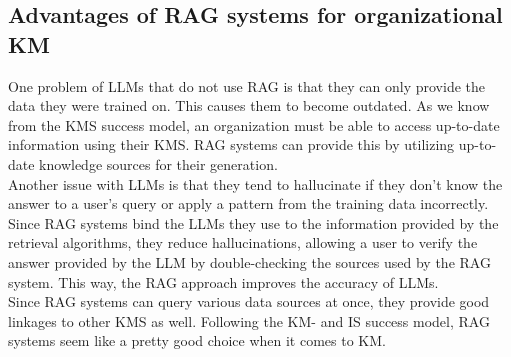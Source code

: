 \documentclass[
	english,
	ruledheaders=section,%
	class=report,%
	thesis={type=bachelor},%
	accentcolor=1b,%
	custommargins=true,%
	marginpar=false,%
	parskip=half-,%
	fontsize=11pt,%
	DIV=14,
]{tudapub}
\begin{document}
\subsection{Advantages of RAG systems for organizational KM}
One problem of LLMs that do not use RAG is that they can only provide the data they were trained on. This causes them to become outdated. As we know from the KMS success model, an organization must be able to access up-to-date information using their KMS. RAG systems can provide this by utilizing up-to-date knowledge sources for their generation.\\
Another issue with LLMs is that they tend to hallucinate if they don't know the answer to a user's query or apply a pattern from the training data incorrectly. Since RAG systems bind the LLMs they use to the information provided by the retrieval algorithms, they reduce hallucinations, allowing a user to verify the answer provided by the LLM by double-checking the sources used by the RAG system. This way, the RAG approach improves the accuracy of LLMs.\\
Since RAG systems can query various data sources at once, they provide good linkages to other KMS as well. Following the KM- and IS success model, RAG systems seem like a pretty good choice when it comes to KM. \\
\end{document}
